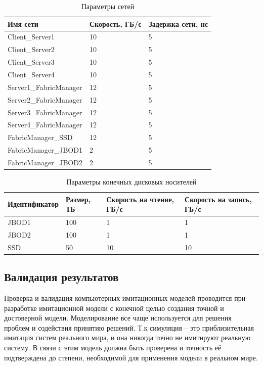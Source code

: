 \begin{table}
\centering
\caption{Параметры сетей}
\label{tab:links}
\begin{tabularx}{\textwidth}{|l|l|l|} 
\hline
Имя сети               & Скорость, ГБ/с & Задержка сети, нс  \\ 
\hline
Client\_Server1        & 10             & 5                  \\ 
\hline
Client\_Server2        & 10             & 5                  \\ 
\hline
Client\_Server3        & 10             & 5                  \\ 
\hline
Client\_Server4        & 10             & 5                  \\ 
\hline
Server1\_FabricManager & 12             & 5                  \\ 
\hline
Server2\_FabricManager & 12             & 5                  \\ 
\hline
Server3\_FabricManager & 12             & 5                  \\ 
\hline
Server4\_FabricManager & 12             & 5                  \\ 
\hline
FabricManager\_SSD     & 12             & 5                  \\ 
\hline
FabricManager\_JBOD1   & 2              & 5                  \\ 
\hline
FabricManager\_JBOD2   & 2              & 5                  \\
\hline
\end{tabularx}
\end{table}


\begin{table}[]
\centering
\caption{Параметры конечных дисковых носителей}
\label{tab:storage}
\begin{tabularx}{\textwidth}{|l|l|l|l|}
\hline
Идентификатор & Размер, ТБ & Скорость на чтение, ГБ/с & Скорость на запись, ГБ/с \\ \hline
JBOD1         & 100        & 1                        & 1                        \\ \hline
JBOD2         & 100        & 1                        & 1                        \\ \hline
SSD           & 50         & 10                       & 10                       \\ \hline
\end{tabularx}
\end{table}

\subsection{Валидация результатов}
\par 
Проверка и валидация компьютерных имитационных моделей проводится при разработке имитационной модели с конечной целью создания точной и достоверной модели. Моделирование все чаще используется для решения проблем и содействия принятию решений. Т.к симуляция -- это приблизительная имитация систем реального мира, и она никогда точно не имитируют реальную систему. В связи с этим модель должна быть проверена и точность её подтверждена до степени, необходимой для применения модели в реальном мире.

